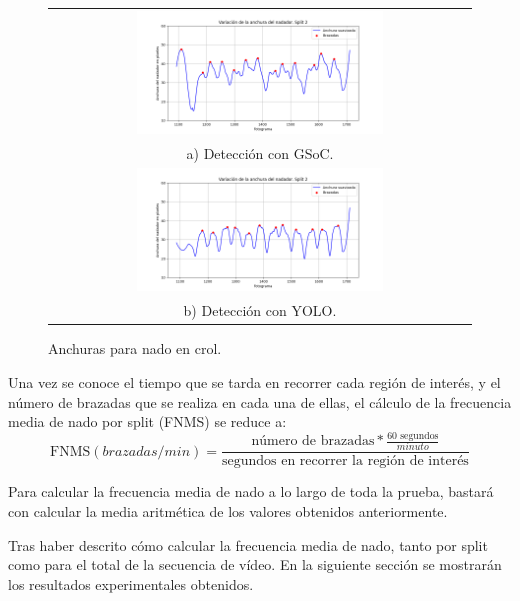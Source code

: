     \begin{figure}
        \centering
        \begin{tabular}{c}
            \includegraphics[width=0.6\textwidth,height=\textheight,keepaspectratio]{imagenes/parte_graficas/anchuras_calle_5_freestyle_GSoC.png}  \\
            a) Detección con GSoC. \\
             \includegraphics[width=0.6\textwidth,height=\textheight,keepaspectratio]{imagenes/parte_graficas/anchuras_calle_5_freestyle_YOLO.png} \\
            b) Detección con YOLO.
        \end{tabular}
        \caption{Anchuras para nado en crol.} %
        \label{fig:anchurascrol}
    \end{figure}


Una vez se conoce el tiempo que se tarda en recorrer cada región de interés, y el número de brazadas que se realiza en cada una de ellas, el cálculo de la frecuencia media de nado por split (FNMS) se reduce a:
\begin{equation}
    \text{FNMS} (brazadas/min) = \frac{ \text{número de brazadas} * \frac{\text{60 segundos}}{minuto} }{ \text{segundos en recorrer la región de interés}}
\end{equation}

Para calcular la frecuencia media de nado a lo largo de toda la prueba, bastará con calcular la media aritmética de los valores obtenidos anteriormente.

Tras haber descrito cómo calcular la frecuencia media de nado, tanto por split como para el total de la secuencia de vídeo. En la siguiente sección se mostrarán los resultados experimentales obtenidos.

